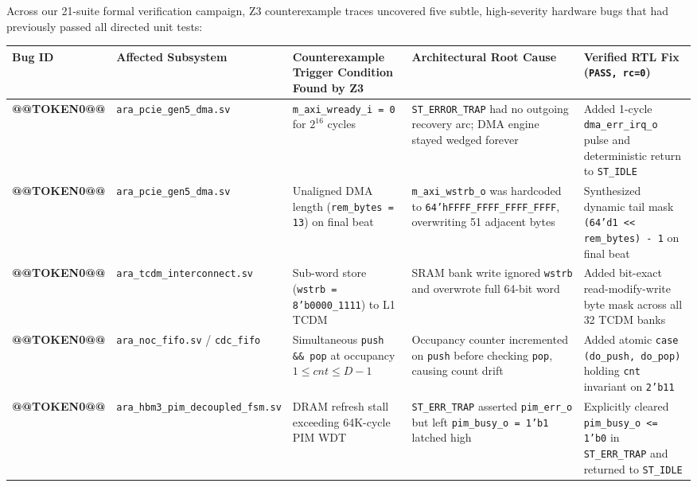 \documentclass[journal,10pt,twocolumn]{IEEEtran}
\begin{document}
Across our 21-suite formal verification campaign, Z3 counterexample traces uncovered five subtle, high-severity hardware bugs that had previously passed all directed unit tests:

\begin{table}[htbp]
\centering\footnotesize
\begin{tabular}{p{} p{} p{} p{} p{}}
\toprule
\textbf{Bug ID} & \textbf{Affected Subsystem} & \textbf{Counterexample Trigger Condition Found by Z3} & \textbf{Architectural Root Cause} & \textbf{Verified RTL Fix (\texttt{PASS, rc=0})} \\
\midrule
\textbf{@@TOKEN0@@} & \texttt{ara\_pcie\_gen5\_dma.sv} & \texttt{m\_axi\_wready\_i = 0} for $2^{16}$ cycles & \texttt{ST\_ERROR\_TRAP} had no outgoing recovery arc; DMA engine stayed wedged forever & Added 1-cycle \texttt{dma\_err\_irq\_o} pulse and deterministic return to \texttt{ST\_IDLE} \\
\textbf{@@TOKEN0@@} & \texttt{ara\_pcie\_gen5\_dma.sv} & Unaligned DMA length (\texttt{rem\_bytes = 13}) on final beat & \texttt{m\_axi\_wstrb\_o} was hardcoded to \texttt{64'hFFFF\_FFFF\_FFFF\_FFFF}, overwriting 51 adjacent bytes & Synthesized dynamic tail mask \texttt{(64'd1 << rem\_bytes) - 1} on final beat \\
\textbf{@@TOKEN0@@} & \texttt{ara\_tcdm\_interconnect.sv} & Sub-word store (\texttt{wstrb = 8'b0000\_1111}) to L1 TCDM & SRAM bank write ignored \texttt{wstrb} and overwrote full 64-bit word & Added bit-exact read-modify-write byte mask across all 32 TCDM banks \\
\textbf{@@TOKEN0@@} & \texttt{ara\_noc\_fifo.sv} / \texttt{cdc\_fifo} & Simultaneous \texttt{push \&\& pop} at occupancy $1 \le cnt \le D-1$ & Occupancy counter incremented on \texttt{push} before checking \texttt{pop}, causing count drift & Added atomic \texttt{case ({do\_push, do\_pop})} holding \texttt{cnt} invariant on \texttt{2'b11} \\
\textbf{@@TOKEN0@@} & \texttt{ara\_hbm3\_pim\_decoupled\_fsm.sv} & DRAM refresh stall exceeding 64K-cycle PIM WDT & \texttt{ST\_ERR\_TRAP} asserted \texttt{pim\_err\_o} but left \texttt{pim\_busy\_o = 1'b1} latched high & Explicitly cleared \texttt{pim\_busy\_o <= 1'b0} in \texttt{ST\_ERR\_TRAP} and returned to \texttt{ST\_IDLE} \\
\bottomrule
\end{tabular}
\vspace{4pt}
\end{table}
\end{document}
